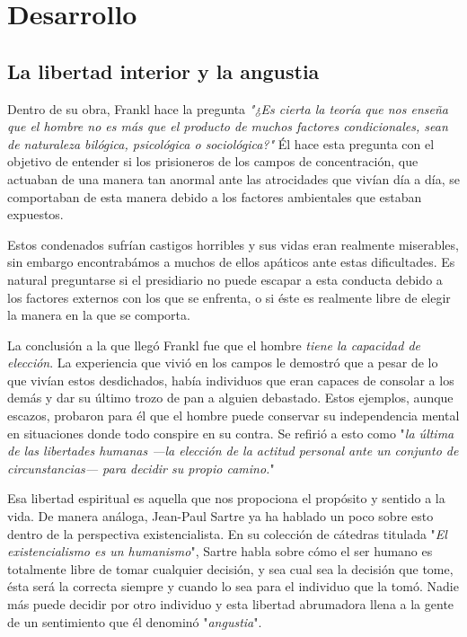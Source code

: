 \documentclass[12pt, letterpaper]{article}
\begin{document}
\section*{Desarrollo}
\subsection*{La libertad interior y la angustia}

Dentro de su obra, Frankl hace la pregunta \textit{"¿Es cierta la teoría que nos enseña que el hombre no es más que el producto de muchos factores condicionales, sean de naturaleza bilógica, psicológica o sociológica?"} Él hace esta pregunta con el objetivo de entender si los prisioneros de los campos de concentración, que actuaban de una manera tan anormal ante las atrocidades que vivían día a día, se comportaban de esta manera debido a los factores ambientales que estaban expuestos.

Estos condenados sufrían castigos horribles y sus vidas eran realmente miserables, sin embargo encontrabámos a muchos de ellos apáticos ante estas dificultades. Es natural preguntarse si el presidiario no puede escapar a esta conducta debido a los factores externos con los que se enfrenta, o si éste es realmente libre de elegir la manera en la que se comporta.

La conclusión a la que llegó Frankl fue que el hombre \textit{tiene la capacidad de elección}. La experiencia que vivió en los campos le demostró que a pesar de lo que vivían estos desdichados, había individuos que eran capaces de consolar a los demás y dar su último trozo de pan a alguien debastado. Estos ejemplos, aunque escazos, probaron para él que el hombre puede conservar su independencia mental en situaciones donde todo conspire en su contra. Se refirió a esto como "\textit{la última de las libertades humanas ---la elección de la actitud personal ante un conjunto de circunstancias--- para decidir su propio camino.}"\autocite{frankl91}

Esa libertad espiritual es aquella que nos propociona el propósito y sentido a la vida. De manera análoga, Jean-Paul Sartre ya ha hablado un poco sobre esto dentro de la perspectiva existencialista. En su colección de cátedras titulada "\textit{El existencialismo es un humanismo}", Sartre habla sobre cómo el ser humano es totalmente libre de tomar cualquier decisión, y sea cual sea la decisión que tome, ésta será la correcta siempre y cuando lo sea para el individuo que la tomó. Nadie más puede decidir por otro individuo y esta libertad abrumadora llena a la gente de un sentimiento que él denominó "\textit{angustia}".
\end{document}
